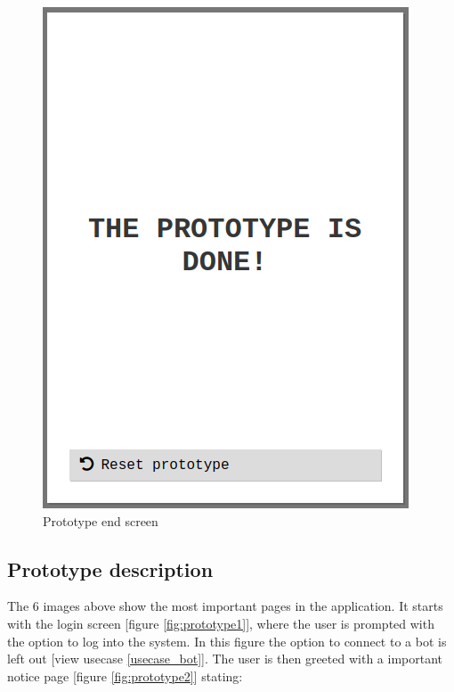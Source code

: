 \begin{table}[H]
\begin{minipage}{.33\textwidth}
\begin{figure}[H]
            \includegraphics[width=0.95\linewidth]{InteraktionsDesign/Assets/Prototype/8.png}
            \caption{Prototype end screen}
            \label{fig:prototype8}
        \end{figure}
    \end{minipage}
    \label{fig:prototype}
\end{table}
\newpage
\subsection{Prototype description}
The 6 images above show the most important pages in the application. It starts with the login screen [figure \ref{fig:prototype1}], where the user is prompted with the option to log into the system. In this figure the option to connect to a bot is left out [view usecase \ref{usecase_bot}].
The user is then greeted with a important notice page [figure \ref{fig:prototype2}] stating:

